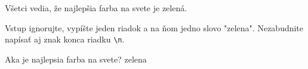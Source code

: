 




Všetci vedia, že najlepšia farba na svete je zelená.


Vstup ignorujte, vypíšte jeden riadok a na ňom jedno slovo "zelena".
Nezabudnite napísať aj znak konca riadku \verb'\n'.


\vstup
Aka je najlepsia farba na svete?
\vystup
zelena
\koniec


